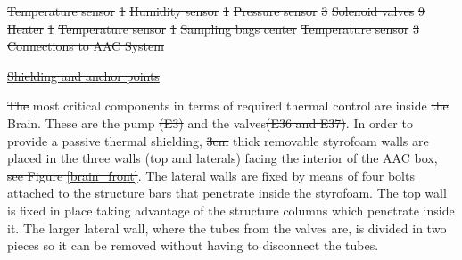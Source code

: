 \documentclass[a4paper,12pt,twoside]{article}
\providecommand{\DIFaddtex}[1]{{\protect\color{blue}\uwave{#1}}} %
\providecommand{\DIFdeltex}[1]{{\protect\color{red}\sout{#1}}}                      %
\providecommand{\DIFaddbegin}{} %
\providecommand{\DIFaddend}{} %
\providecommand{\DIFdelbegin}{} %
\providecommand{\DIFdelend}{} %
\providecommand{\DIFdelFL}[1]{\DIFdel{#1}} %
\providecommand{\DIFadd}[1]{\texorpdfstring{\DIFaddtex{#1}}{#1}} %
\providecommand{\DIFdel}[1]{\texorpdfstring{\DIFdeltex{#1}}{}} %
\newcommand{\DIFscaledelfig}{0.5}
\newlength{\DIFdelgraphicswidth} %
\newlength{\DIFdelgraphicsheight} %
\newcommand{\DIFaddincludegraphics}[2][]{{\color{blue}\fbox{\DIFOincludegraphics[#1]{#2}}}} %
\newcommand{\DIFdelincludegraphics}[2][]{%
\sbox{\DIFdelgraphicsbox}{\DIFOincludegraphics[#1]{#2}}%
\settoboxwidth{\DIFdelgraphicswidth}{\DIFdelgraphicsbox} %
\settoboxtotalheight{\DIFdelgraphicsheight}{\DIFdelgraphicsbox} %
\scalebox{\DIFscaledelfig}{%
\parbox[b]{\DIFdelgraphicswidth}{\usebox{\DIFdelgraphicsbox}\\[-\baselineskip] \rule{\DIFdelgraphicswidth}{0em}}\llap{\resizebox{\DIFdelgraphicswidth}{\DIFdelgraphicsheight}{%
\setlength{\unitlength}{\DIFdelgraphicswidth}%
\begin{picture}(1,1)%
\thicklines\linethickness{2pt} %
{\color[rgb]{1,0,0}\put(0,0){\framebox(1,1){}}}%
{\color[rgb]{1,0,0}\put(0,0){\line( 1,1){1}}}%
{\color[rgb]{1,0,0}\put(0,1){\line(1,-1){1}}}%
\end{picture}%
}\hspace*{3pt}}} %
} %
\DeclareRobustCommand{\DIFaddbegin}{\DIFOaddbegin \let\includegraphics\DIFaddincludegraphics} %
\DeclareRobustCommand{\DIFaddend}{\DIFOaddend \let\includegraphics\DIFOincludegraphics} %
\DeclareRobustCommand{\DIFdelbegin}{\DIFOdelbegin \let\includegraphics\DIFdelincludegraphics} %
\DeclareRobustCommand{\DIFdelend}{\DIFOaddend \let\includegraphics\DIFOincludegraphics} %
\begin{document}
\DIFdelFL{Temperature sensor    }%
\DIFdelFL{1  }%
\DIFdelFL{Humidity sensor       }%
\DIFdelFL{1  }%
\DIFdelFL{Pressure sensor       }%
\DIFdelFL{3  }%
\DIFdelFL{Solenoid valves       }%
\DIFdelFL{9  }%
\DIFdelFL{Heater                }%
\DIFdelFL{1  }%
\DIFdelFL{Temperature sensor    }%
\DIFdelFL{1  }%
\DIFdelFL{Sampling bags center                                         }%
\DIFdelFL{Temperature sensor    }%
\DIFdelFL{3  }%
{%
\DIFdelFL{Connections to AAC System}}

\underline{\DIFdel{Shielding and anchor points}}

\DIFdel{The }\DIFdelend most critical components in terms of required thermal control are inside \DIFdelbegin \DIFdel{the }\DIFdelend \DIFaddbegin \DIFadd{The }\DIFaddend Brain. These are the pump \DIFdelbegin \DIFdel{(E3) }\DIFdelend and the valves\DIFdelbegin \DIFdel{(E36 and E37)}\DIFdelend . In order to provide a passive thermal shielding, \DIFdelbegin \DIFdel{3cm }\DIFdelend \DIFaddbegin \DIFadd{3 cm }\DIFaddend thick removable styrofoam walls are placed in the three walls (top and laterals) facing the interior of the AAC box, \DIFdelbegin \DIFdel{see Figure \ref{brain_front}}\DIFdelend \DIFaddbegin \DIFadd{shown in Figure \ref{brain_isometric}}\DIFaddend . The lateral walls are fixed by means of four bolts attached to the structure bars that penetrate inside the styrofoam. The top wall is fixed in place taking advantage of the structure columns which penetrate inside it. The larger lateral wall, where the tubes from the valves are, is divided in two pieces so it can be removed without having to disconnect the tubes. 
\end{document}
